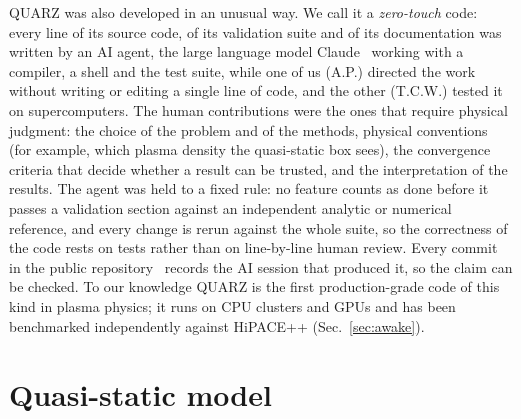 \documentclass[aps,prab,reprint,floatfix,superscriptaddress,amsmath,amssymb]{revtex4-2}
\begin{document}
QUARZ was also developed in an unusual way. We call it a \emph{zero-touch} code: every line of its source code, of its validation suite and of its documentation was written by an AI agent, the large language model Claude~\cite{Claude} working with a compiler, a shell and the test suite, while one of us (A.P.) directed the work without writing or editing a single line of code, and the other (T.C.W.) tested it on supercomputers. The human contributions were the ones that require physical judgment: the choice of the problem and of the methods, physical conventions (for example, which plasma density the quasi-static box sees), the convergence criteria that decide whether a result can be trusted, and the interpretation of the results. The agent was held to a fixed rule: no feature counts as done before it passes a validation section against an independent analytic or numerical reference, and every change is rerun against the whole suite, so the correctness of the code rests on tests rather than on line-by-line human review. Every commit in the public repository~\cite{QUARZ} records the AI session that produced it, so the claim can be checked. To our knowledge QUARZ is the first production-grade code of this kind in plasma physics; it runs on CPU clusters and GPUs and has been benchmarked independently against HiPACE++ (Sec.~\ref{sec:awake}).

\section{Quasi-static model}\label{sec:model}
\end{document}
